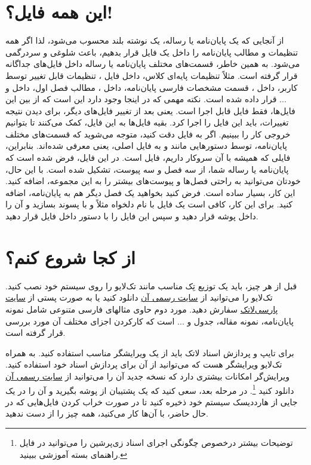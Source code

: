 \section{این همه فایل؟!}\label{sec2}
از آنجایی که یک پایان‌نامه یا رساله، یک نوشته بلند محسوب می‌شود، لذا اگر همه تنظیمات و مطالب پایان‌نامه را داخل یک فایل قرار بدهیم، باعث شلوغی
و سردرگمی می‌شود. به همین خاطر، قسمت‌های مختلف پایان‌نامه یا رساله  داخل فایل‌های جداگانه قرار گرفته است. مثلاً تنظیمات پایه‌ای کلاس، داخل فایل
، 
تنظیمات قابل تغییر توسط کاربر، داخل 
،
قسمت مشخصات فارسی پایان‌نامه، داخل 
،
مطالب فصل اول، داخل 
و ... قرار داده شده است. نکته مهمی که در اینجا وجود دارد این است که از بین این  فایل‌ها، فقط فایل 
قابل اجرا است. یعنی بعد از تغییر فایل‌های دیگر، برای دیدن نتیجه تغییرات، باید این فایل را اجرا کرد. بقیه فایل‌ها به این فایل، کمک می‌کنند تا بتوانیم خروجی کار را ببینیم. اگر به فایل 
دقت کنید، متوجه می‌شوید که قسمت‌های مختلف پایان‌نامه، توسط دستورهایی مانند 
و
به فایل اصلی، یعنی 
معرفی شده‌اند. بنابراین، فایلی که همیشه با آن سروکار داریم، فایل 
است.
در این فایل، فرض شده است که پایان‌نامه یا رساله شما، از سه فصل و سه پیوست، تشکیل شده است. با این حال، خودتان می‌توانید به راحتی فصل‌ها و پیوست‌های بیشتر را به این مجموعه، اضافه کنید. این کار، بسیار ساده است. فرض کنید بخواهید یک فصل دیگر هم به پایان‌نامه، اضافه کنید. برای این کار، کافی است یک فایل با نام دلخواه مثلاً 
و با پسوند 
بسازید و آن را داخل پوشه 
قرار دهید و سپس این فایل را با دستور 
\verb!!
داخل فایل
 قرار دهید.

\section{از کجا شروع کنم؟}
قبل از هر چیز، باید یک توزیع تِک مناسب مانند تک‌لایو
را روی سیستم خود نصب کنید. تک‌لایو  را می‌توانید از 
 \href{http://www.tug.org/texlive}{سایت رسمی آن}%
 دانلود کنید یا به صورت پستی از 
 \href{http://www.parsilatex.com}{سایت پارسی‌لاتک}%
سفارش دهید. مورد دوم حاوی مثالهای فارسی متنوعی شامل نمونه پایان‌نامه، نمونه مقاله، جدول و ... است که کارکردن اجزای مختلف آن مورد بررسی قرار گرفته است.

برای تایپ و پردازش اسناد لاتک باید از یک ویرایشگر مناسب استفاده کنید. به همراه تک‌لایو ویرایشگر  هست که می‌توانید از آن برای پردازش اسناد خود استفاده کنید. 
ویرایش‌گر 
امکانات بیشتری دارد که نسخه جدید  آن را می‌توانید  از 
 \href{http://www.texstudio.org}{سایت رسمی آن‌} 
 دانلود کنید
 \footnote{توضیحات بیشتر درخصوص چگونگی اجرای اسناد زی‌پرشین را می‌توانید در فایل راهنمای بسته آموزشی ببینید.}.
در مرحله بعد، سعی کنید که  یک پشتیبان از پوشه 
 بگیرید و آن را در یک جایی از هارددیسک سیستم خود ذخیره کنید تا در صورت خراب کردن فایل‌هایی که در حال حاضر، با آن‌ها کار می‌کنید، همه چیز را از 
 دست ندهید.
 
